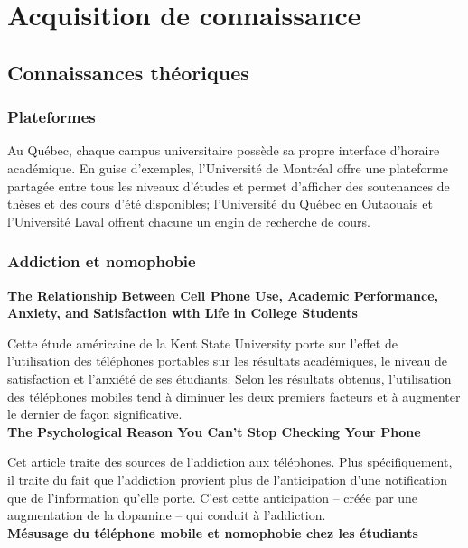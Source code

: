 \section{Acquisition de connaissance}

	\subsection{Connaissances théoriques}
		\subsubsection{Plateformes}
		Au Québec, chaque campus universitaire possède sa propre interface d'horaire académique. En guise d'exemples, l'Université de Montréal offre une plateforme partagée entre tous les niveaux d'études et permet d'afficher des soutenances de thèses et des cours d'été disponibles; l'Université du Québec en Outaouais et l'Université Laval offrent chacune un engin de recherche de cours.
		
		\subsubsection{Addiction et nomophobie}
		
		{\bfseries \cite{relationship} The Relationship Between Cell Phone Use, Academic Performance, Anxiety, and Satisfaction with Life in College Students}	
		
		Cette étude américaine de la Kent State University porte sur l'effet de l'utilisation des téléphones portables sur les résultats académiques, le niveau de satisfaction et l'anxiété de ses étudiants. Selon les résultats obtenus, l'utilisation des téléphones mobiles tend à diminuer les deux premiers facteurs et à augmenter le dernier de façon significative. \\
		
		{\bfseries \cite{cannotStop} The Psychological Reason You Can't Stop Checking Your Phone}
		
		Cet article traite des sources de l'addiction aux téléphones. Plus spécifiquement, il traite du fait que l'addiction provient plus de l'anticipation d'une notification que de l'information qu'elle porte. C'est cette anticipation -- créée par une augmentation de la dopamine -- qui conduit à l'addiction. \\
		
		{\bfseries \cite{mesusage} Mésusage du téléphone mobile et nomophobie chez les étudiants}
		

